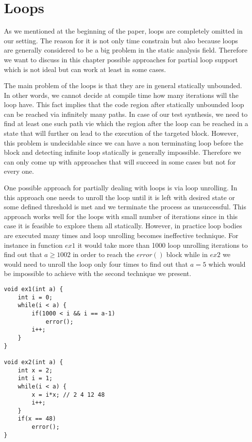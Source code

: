 \documentclass[letterpaper,12pt]{article}
\begin{document}
\section{Loops}
As we mentioned at the beginning of the paper, loops are completely omitted in our setting. The reason for it is not only time constrain but also because loops are generally considered to be a big problem in the static analysis field. Therefore we want to discuss in this chapter possible approaches for partial loop support which is not ideal but can work at least in some cases.

The main problem of the loops is that they are in general statically unbounded. In other words, we cannot decide at compile time how many iterations will the loop have. This fact implies that the code region after statically unbounded loop can be reached via infinitely many paths. In case of our test synthesis, we need to find at least one such path vie which the region after the loop can be reached in a state that will further on lead to the execution of the targeted block. However, this problem is undecidable since we can have a non terminating loop before the block and detecting infinite loop statically is generally impossible. Therefore we can only come up with approaches that will succeed in some cases but not for every one.

One possible approach for partially dealing with loops is via loop unrolling. In this approach one needs to unroll the loop until it is left with desired state or some defined threshold is met and we terminate the process as unsuccessful. This approach works well for the loops with small number of iterations since in this case it is feasible to explore them all statically. However, in practice loop bodies are executed many times and loop unrolling becomes ineffective technique. For instance in function $ex1$ it would take more than 1000 loop unrolling iterations to find out that $a \geq 1002$ in order to reach the $error()$ block while in $ex2$ we would need to unroll the loop only four times to find out that $a = 5$ which would be impossible to achieve with the second technique we present.

\begin{lstlisting}
void ex1(int a) {
	int i = 0;
	while(i < a) {
		if(1000 < i && i == a-1)
			error();
		i++;
	}
}

void ex2(int a) {
	int x = 2;
	int i = 1;
	while(i < a) {
		x = i*x; // 2 4 12 48
		i++;
	}
	if(x == 48)
		error();
}
\end{lstlisting}
\end{document}

